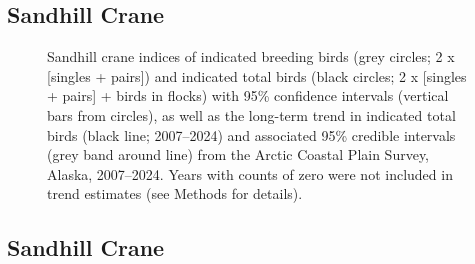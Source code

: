 \documentclass[
]{article}
\begin{document}
\newpage{}

\subsection*{Sandhill Crane}\label{sandhill-crane}

\begin{figure}


\caption{\label{fig-SACR}Sandhill crane indices of indicated breeding
birds (grey circles; 2 x {[}singles + pairs{]}) and indicated total
birds (black circles; 2 x {[}singles + pairs{]} + birds in flocks) with
95\% confidence intervals (vertical bars from circles), as well as the
long-term trend in indicated total birds (black line; 2007--2024) and
associated 95\% credible intervals (grey band around line) from the
Arctic Coastal Plain Survey, Alaska, 2007--2024. Years with counts of
zero were not included in trend estimates (see Methods for details).}

\end{figure}%

\newpage{}

\subsection*{Sandhill Crane}\label{sandhill-crane-1}

\begingroup\fontsize{10}{12}\selectfont
\end{document}
